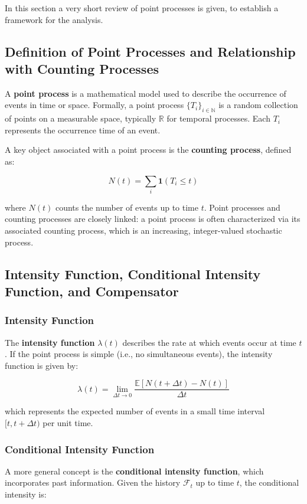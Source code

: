 \documentclass[11pt]{article}
\begin{document}
In this section a very short review of point processes is given, to establish a framework for the analysis.

\subsection{Definition of Point Processes and Relationship with Counting Processes}

A \textbf{point process} is a mathematical model used to describe the occurrence of events in time or space. Formally, a point process $\{T_i\}_{i \in \mathbb{N}}$ is a random collection of points on a measurable space, typically $\mathbb{R}$ for temporal processes. Each $T_i$ represents the occurrence time of an event.

A key object associated with a point process is the \textbf{counting process}, defined as:

\[
  N(t) = \sum_{i} \mathbf{1}(T_i \leq t)
\]

where $N(t)$ counts the number of events up to time $t$. Point processes and counting processes are closely linked: a point process is often characterized via its associated counting process, which is an increasing, integer-valued stochastic process.

\subsection{Intensity Function, Conditional Intensity Function, and Compensator}

\subsubsection{Intensity Function}

The \textbf{intensity function} $\lambda(t)$ describes the rate at which events occur at time $t$. If the point process is simple (i.e., no simultaneous events), the intensity function is given by:

\[
  \lambda(t) = \lim_{\Delta t \to 0} \frac{\mathbb{E}[N(t+\Delta t) - N(t)]}{\Delta t}
\]

which represents the expected number of events in a small time interval $[t, t+\Delta t)$ per unit time.

\subsubsection{Conditional Intensity Function}

A more general concept is the \textbf{conditional intensity function}, which incorporates past information. Given the history $\mathcal{F}_t$ up to time $t$, the conditional intensity is:
\end{document}
